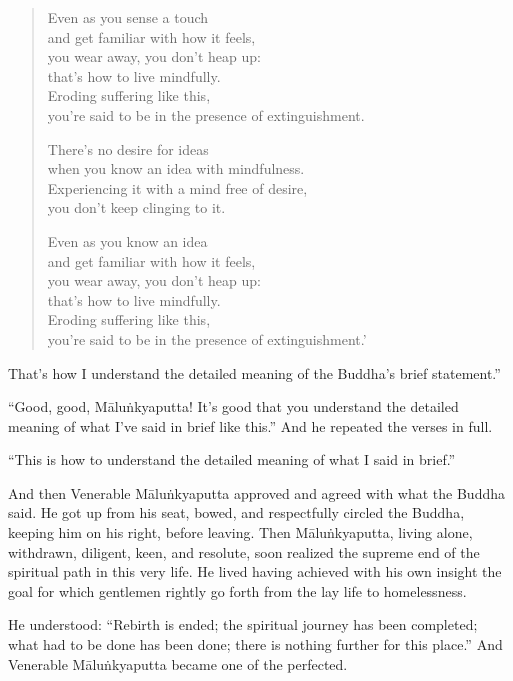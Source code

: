 \documentclass[12pt,openany]{book}%
\begin{document}
\begin{verse}
Even as you sense a touch \\
and get familiar with how it feels, \\
you wear away, you don’t heap up: \\
that’s how to live mindfully. \\
Eroding suffering like this, \\
you’re said to be in the presence of extinguishment. 

There’s no desire for ideas \\
when you know an idea with mindfulness. \\
Experiencing it with a mind free of desire, \\
you don’t keep clinging to it. 

Even as you know an idea \\
and get familiar with how it feels, \\
you wear away, you don’t heap up: \\
that’s how to live mindfully. \\
Eroding suffering like this, \\
you’re said to be in the presence of extinguishment.’ 

%
\end{verse}

That’s how I understand the detailed meaning of the Buddha’s brief statement.” 

“Good, good, \textsanskrit{Māluṅkyaputta}! It’s good that you understand the detailed meaning of what I’ve said in brief like this.” And he repeated the verses in full. 

“This is how to understand the detailed meaning of what I said in brief.” 

And then Venerable \textsanskrit{Māluṅkyaputta} approved and agreed with what the Buddha said. He got up from his seat, bowed, and respectfully circled the Buddha, keeping him on his right, before leaving. Then \textsanskrit{Māluṅkyaputta}, living alone, withdrawn, diligent, keen, and resolute, soon realized the supreme end of the spiritual path in this very life. He lived having achieved with his own insight the goal for which gentlemen rightly go forth from the lay life to homelessness. 

He understood: “Rebirth is ended; the spiritual journey has been completed; what had to be done has been done; there is nothing further for this place.” And Venerable \textsanskrit{Māluṅkyaputta} became one of the perfected. 
\end{document}
